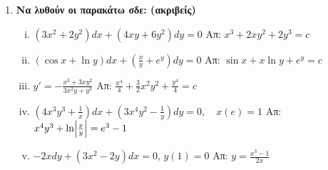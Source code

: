 \documentclass[a4paper,table]{report}
\begin{document}
\begin{enumerate}

  \item {\bfseries Να λυθούν οι παρακάτω σδε: (ακριβείς)}
    \begin{enumerate}[i)]
      \item $ (3x^{2}+2y^{2})dx+(4xy+6y^{2})dy=0  $ 
        \hfill Απ: $ x^{3}+2xy^{2}+2y^{3}=c $ 
      \item $ (\cos{x} + \ln{y})dx + \left(\frac{x}{y} + e^{y}\right)dy=0 $ 
        \hfill Απ: $ \sin{x} + x \ln{y} + e^{y}=c $ 
      \item $ y'=- \frac{x^{3}+3xy^{2}}{3x^{2}y+y^{3}} $ 
        \hfill Απ: $ \frac{x^{4}}{4}+\frac{3}{2} x^{2}y^{2}+\frac{y^{4}}{4} = c $ 
      \item $\left(4x^3y^3+\frac{1}{x}\right)dx+\left(3x^4y^2-
        \frac{1}{y}\right)dy=0, \quad x(e)=1$
        \hfill Απ: $x^4y^3+\ln \Bigl|\frac{x}{y}\Bigr|=e^3-1$
      \item $ -2xdy + (3x^{2}-2y)dx=0 $, \quad $ y(1)=0 $ 
        \hfill Απ: $ y= \frac{x^{3}-1}{2x} $ 
    \end{enumerate}


\end{enumerate}
\end{document}
